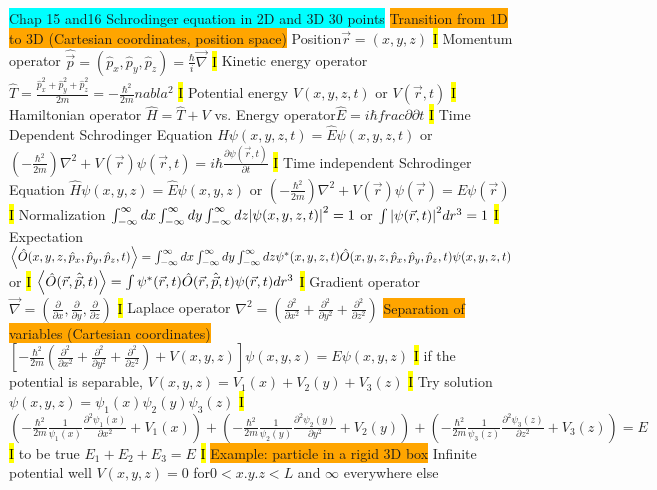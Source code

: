 \documentclass[fontsize=4pt]{scrartcl}
\begin{document}
\colorbox{Cyan}{Chap 15 and16 Schrodinger equation in 2D and 3D 30 points}
\colorbox{Orange}{Transition from 1D to 3D (Cartesian coordinates, position space)}
Position$\vec{r} = (x,y,z)$
\hl{I}
Momentum operator $\hat{\vec{p}} = (\hat{p}_x, \hat{p}_y, \hat{p}_z) = \frac{\hbar}{i}\vec{\nabla}$
\hl{I}
Kinetic energy operator $\hat{T} = \frac{\hat{p}_x ^2+ \hat{p}_y^2 + \hat{p}_z^2}{2m} = -\frac{\hbar^2}{2m}nabla^2$
\hl{I}
Potential energy $V(x,y,z,t)$ or $V(\vec{r},t)$
\hl{I}
Hamiltonian operator $\hat{H} = \hat{T} + V$ vs. Energy operator$ \hat{E} = i\hbar frac{\partial}{\partial t}$
\hl{I}
Time Dependent Schrodinger Equation $\hat{H}\psi(x,y,z,t) = \hat{E}\psi(x,y,z,t)$ or $(-\frac{\hbar^2}{2m})\nabla^2 + V(\vec{r})\psi(\vec{r},t) = i\hbar \frac{\partial \psi(\vec{r}, t)}{\partial t}$
\hl{I}
Time independent Schrodinger Equation $\hat{H}\psi(x,y,z) = \hat{E}\psi(x,y,z)$ or $(-\frac{\hbar^2}{2m})\nabla^2 + V(\vec{r})\psi(\vec{r}) = E \psi(\vec{r})$
\hl{I}
Normalization $\int_{-\infty}^{\infty} dx \int_{-\infty}^{\infty} dy \int_{-\infty}^{\infty} dz \abs{\psi(x,y,z,t)}^2 = 1$ or $\int \abs{\psi(\vec{r},t)}^2 dr^3 = 1$
\hl{I}
Expectation $\expval{\hat{O}(x,y,z,\hat{p}_x,\hat{p}_y,\hat{p}_z,t)} = \int_{-\infty}^{\infty} dx \int_{-\infty}^{\infty} dy \int_{-\infty}^{\infty} dz \psi^*(x,y,z,t) \hat{O}(x,y,z,\hat{p}_x,\hat{p}_y,\hat{p}_z,t)\psi(x,y,z,t) $ or
\hl{I}
$\expval {\hat{O}(\vec{r},\hat{\vec{p}},t)} = \int \psi^* (\vec{r},t)\hat{O}(\vec{r},\hat{\vec{p}},t) \psi(\vec{r},t) dr^3$
\hl{I}
Gradient operator $\vec{\nabla} = (\frac{\partial}{\partial x} , \frac{\partial}{\partial y}, \frac{\partial}{\partial z})$
\hl{I}
Laplace operator $\nabla^2 =(\frac{\partial^2}{\partial x^2} + \frac{\partial^2}{\partial y^2} + \frac{\partial^2}{\partial z^2}) $
\colorbox{Orange}{Separation of variables (Cartesian coordinates)}
$[-\frac{\hbar^2}{2m}(\frac{\partial^2}{\partial x^2} + \frac{\partial^2}{\partial y^2} + \frac{\partial^2}{\partial z^2}) + V(x,y,z)] \psi(x,y,z) = E\psi(x,y,z)$
\hl{I}
if the potential is separable, $V(x,y,z) = V_1(x) + V_2(y)+V_3(z)$
\hl{I}
Try solution $\psi(x,y,z) = \psi_1(x) \psi_2(y) \psi_3(z)$
\hl{I}
$(-\frac{\hbar^2}{2m}\frac{1}{\psi_1(x)} \frac{\partial^2 \psi_1(x)}{\partial x^2} + V_1(x)) +  (-\frac{\hbar^2}{2m}\frac{1}{\psi_2(y)} \frac{\partial^2 \psi_2(y)}{\partial y^2} + V_2(y)) + (-\frac{\hbar^2}{2m}\frac{1}{\psi_3(z)} \frac{\partial^2 \psi_3(z)}{\partial z^2} + V_3(z)) = E$
\hl{I}
to be true $E_1 + E_2 + E_3 = E$
\hl{I}
\colorbox{Orange}{Example: particle in a rigid 3D box}
Infinite potential well $V(x,y,z) = 0$ for$0<x.y.z<L$ and $\infty$ everywhere else
\end{document}
